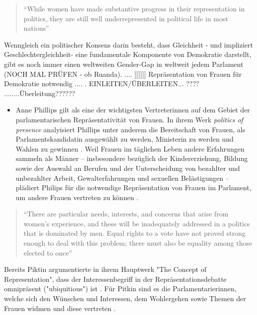 \documentclass[12pt, 
    twoside=false, 
    bibliography=totoc, 
    numbers=endperiod, 
    headings=normal, 
    toc=chapterentrydotfill
    ]{scrbook}
\begin{document}
\begin{quote}
    \enquote{While women have made substantive progress in their representation in politics, they are still well underrepresented in political life in most nations} \parencite[2]{coffe_2013}
\end{quote}

Wenngleich ein politischer Konsens darin besteht, dass Gleichheit - und impliziert Geschlechtergleichheit- eine fundamentale Komponente von Demokratie darstellt, gibt es noch immer einen weltweiten Gender-Gap in weltweit jedem Parlament (NOCH MAL PRÜFEN - ob Ruanda).  ....
]]]]]]
 Repräsentation von Frauen für Demokratie notwendig .... . EINLEITEN/ÜBERLEITEN... ???? ........Überleitung??????

\begin{itemize}
\item Anne Phillips gilt als eine der wichtigsten Vertreterinnen auf dem Gebiet der parlamentarischen Repräsentativität von Frauen. In ihrem Werk \emph{politics of presence} \parencite*{phillips_1998} analyisiert Phillips unter anderem die Bereitschaft von Frauen, als Parlamentskandidatin ausgewählt zu werden, Ministerin zu werden und Wahlen zu gewinnen \parencite[vgl.][416f.]{blaxill_2016}. 
Weil Frauen im täglichen Leben andere Erfahrungen sammeln als Männer -- insbesondere bezüglich der Kindererziehung, Bildung sowie der Auswahl an Berufen und der Unterscheidung von bezahlter und unbezahlter Arbeit, Gewalterfahrungen und sexuellen Belästigungen -- plädiert Philips für die notwendige Repräsentation von Frauen im Parlament, um andere Frauen vertreten zu können \parencite[vgl.][52]{wangnerud_2009}.
\end{itemize}

\begin{quote}
    \enquote{There are particular needs, interests, and concerns that arise from women's experience, and these will be inadequately addressed in a politics that is dominated by men. Equal rights to a vote have not proved strong enough to deal with this problem; there must also be equality among those elected to once} \parencite[66]{phillips_1998}
\end{quote}

Bereits Piktin \parencite*{pitkin_1972} argumentierte in ihrem Hauptwerk "The Concept of Representation", dass der Interessenbegriff in der Repräsentationsdebatte omnipräsent ("ubiquitious") ist \parencite[69]{wangnerud_2000}. Für Pitkin sind es die Parlamentarierinnen, welche sich den Wünschen und Interessen, dem Wohlergehen sowie Themen der Frauen widmen und diese vertreten \parencites[vgl.][413]{blaxill_2016}{pitkin_1972}. 
\end{document}
